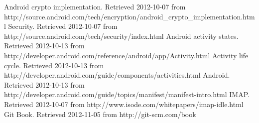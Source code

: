 \documentclass[12pt]{report}
\begin{document}
\begin{thebibliography}{99}
 Android crypto implementation. Retrieved 2012-10-07 from http://source.android.com/tech/encryption/android\_crypto\_implementation.html
 Security. Retrieved 2012-10-07 from http://source.android.com/tech/security/index.html
 Android activity states. Retrieved 2012-10-13 from http://developer.android.com/reference/android/app/Activity.html
 Activity life cycle. Retrieved 2012-10-13 from http://developer.android.com/guide/components/activities.html
 Android. Retrieved 2012-10-13 from http://developer.android.com/guide/topics/manifest/manifest-intro.html
 IMAP. Retrieved 2012-10-07 from http://www.isode.com/whitepapers/imap-idle.html
 Git Book. Retrieved 2012-11-05 from http://git-scm.com/book


\end{thebibliography}
\end{document}
